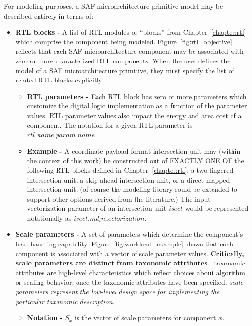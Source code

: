 \begin{itemize}
For modeling purposes, a SAF microarchitecture primitive model may be described entirely in terms of:

\begin{itemize}
    \item \textbf{RTL blocks -} A list of RTL modules or ``blocks'' from Chapter~\ref{chapter:rtl} which comprise the component being modeled. Figure~\ref{fig:rtl_objective} reflects that each SAF microarchitecture component may be associated with zero or more characterized RTL components. When the user defines the model of a SAF microarchitecture primitive, they must specify the list of related RTL blocks explicitly.
    \begin{itemize}
        \item \textbf{RTL parameters -} Each RTL block has zero or more parameters which customize the digital logic implementation as a function of the parameter values. RTL parameter values also impact the energy and area cost of a component. The notation for a given RTL parameter is $rtl\_name.param\_name$
        \item \textbf{Example -} A coordinate-payload-format\cite{sparseloop}\cite{szebook} intersection unit\cite{extensor} may (within the context of this work) be constructed out of EXACTLY ONE OF the following RTL blocks defined in Chapter~\ref{chapter:rtl}: a two-fingered intersection unit\cite{extensor}, a skip-ahead intersection unit\cite{extensor}, or a direct-mapped intersection unit.\cite{extensor} (of course the modeling library could be extended to support other options derived from the literature.) The input vectorization parameter of an intersection unit $isect$ would be represented notationally as $isect.md_in_vectorization$.
    \end{itemize}
    \item \textbf{Scale parameters -} A set of parameters which determine the component's load-handling capability. Figure~\ref{fig:workload_example} shows that each component is associated with a vector of scale parameter values. \textbf{Critically, scale parameters are distinct from taxonomic attributes} - taxonomic attributes are high-level characteristics which reflect choices about algorithm or scaling behavior; once the taxonomic attributes have been specified, \textit{scale parameters represent the low-level design space for implementing the particular taxonomic description.}
    \begin{itemize}
        \item \textbf{Notation -} $S_x$ is the vector of scale parameters for component $x$.

\end{itemize}
\end{itemize}
\end{itemize}
